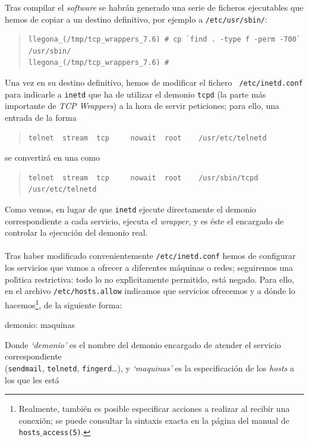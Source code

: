 Tras compilar el {\it software} se habr\'an generado una serie de ficheros
ejecutables que hemos de copiar a un destino definitivo, por ejemplo a 
{\tt /etc/usr/sbin/}:
\begin{quote}
\begin{verbatim}
llegona_(/tmp/tcp_wrappers_7.6) # cp `find . -type f -perm -700` /usr/sbin/
llegona_(/tmp/tcp_wrappers_7.6) # 
\end{verbatim}
\end{quote}
Una vez en su destino definitivo, hemos de modificar el fichero {\tt 
/etc/inetd.conf} para indicarle a {\tt inetd} que ha de utilizar el demonio 
{\tt tcpd} (la parte m\'as importante de {\it TCP Wrappers}) a la hora de 
servir peticiones; para ello, una entrada de la forma 
\begin{quote}
\begin{verbatim}
telnet  stream  tcp     nowait  root    /usr/etc/telnetd 
\end{verbatim}
\end{quote}
se convertir\'a en una como 
\begin{quote}
\begin{verbatim}
telnet  stream  tcp     nowait  root    /usr/sbin/tcpd  /usr/etc/telnetd 
\end{verbatim}
\end{quote}
Como vemos, en lugar de que {\tt inetd} ejecute directamente el demonio
correspondiente a cada servicio, ejecuta el {\it wrapper}, y es \'este el 
encargado de controlar la ejecuci\'on del demonio real.\\
\\Tras haber modificado convenientemente {\tt /etc/inetd.conf} hemos de
configurar
los servicios que vamos a ofrecer a diferentes m\'aquinas o redes; seguiremos 
una pol\'{\i}tica restrictiva: todo lo no expl\'{\i}citamente permitido, est\'a
negado. Para ello, en el archivo {\tt /etc/hosts.allow} indicamos que servicios
ofrecemos y a d\'onde lo hacemos\footnote{Realmente, tambi\'en es posible
especificar acciones a realizar al recibir una conexi\'on; se puede consultar
la sintaxis exacta en la p\'agina del manual de {\tt hosts$\_$access(5)}.}, de 
la siguiente forma:
\it
\begin{center}
demonio: maquinas
\end{center}
\rm
Donde {\it `demonio'} es el nombre del demonio encargado de atender el servicio
correspondiente \\({\tt sendmail}, {\tt telnetd}, {\tt fingerd}\ldots), y {\it
`maquinas'} es la especificaci\'on de los {\it hosts} a los que les est\'a
